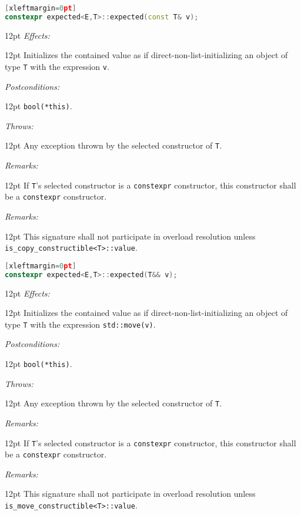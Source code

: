 \documentclass[a4paper,10pt]{article}
\newcommand{\cpp}[1]{\lstinline{#1}}
\newcommand{\wordingItem}[1]{\noindent\textit{#1:}}
\newenvironment{wordingTextItem}[1]{\wordingItem{#1}\vspace{2pt}\noindent\begin{adjustwidth}{12pt}{}}{\vspace{2pt}\end{adjustwidth}}
\newenvironment{wordingPara}{\begin{adjustwidth}{12pt}{}}{\end{adjustwidth}}
\begin{document}
\begin{lstlisting}[language=C++][xleftmargin=0pt]
constexpr expected<E,T>::expected(const T& v);
\end{lstlisting}
\begin{wordingPara}
\begin{wordingTextItem}{Effects}
Initializes the contained value as if direct-non-list-initializing an object of type \cpp{T} with the expression \cpp{v}.
\end{wordingTextItem}
\begin{wordingTextItem}{Postconditions}
\cpp{bool(*this)}.
\end{wordingTextItem}
\begin{wordingTextItem}{Throws}
Any exception thrown by the selected constructor of \cpp{T}.
\end{wordingTextItem}
\begin{wordingTextItem}{Remarks}
If \cpp{T}'s selected constructor is a \cpp{constexpr} constructor, this constructor shall be a \cpp{constexpr} constructor.
\end{wordingTextItem}
\begin{wordingTextItem}{Remarks}
This signature shall not participate in overload resolution unless\\
\cpp{is_copy_constructible<T>::value}. 
\end{wordingTextItem}
\end{wordingPara}

\begin{lstlisting}[language=C++][xleftmargin=0pt]
constexpr expected<E,T>::expected(T&& v); 
\end{lstlisting}
\begin{wordingPara}
\begin{wordingTextItem}{Effects}
Initializes the contained value as if direct-non-list-initializing an object of type \cpp{T} with the expression \cpp{std::move(v)}.
\end{wordingTextItem}
\begin{wordingTextItem}{Postconditions}
\cpp{bool(*this)}.
\end{wordingTextItem}
\begin{wordingTextItem}{Throws}
Any exception thrown by the selected constructor of \cpp{T}.
\end{wordingTextItem}
\begin{wordingTextItem}{Remarks}
If \cpp{T}'s selected constructor is a \cpp{constexpr} constructor, this constructor shall be a \cpp{constexpr} constructor.
\end{wordingTextItem}
\begin{wordingTextItem}{Remarks}
This signature shall not participate in overload resolution unless\\
\cpp{is_move_constructible<T>::value}.
\end{wordingTextItem}
\end{wordingPara}
\end{document}
